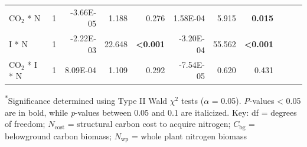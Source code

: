 \begin{landscape}
\begin{table}
{\begin{tabular}{p{3cm}p{0.5cm}p{1.75cm}p{1.5cm}p{1.5cm}p{1.75cm}p{1.5cm}p{1.5cm}p{1.75cm}p{1.5cm}p{1.5cm}}
            CO$_2$ * N & \multicolumn{1}{r}{1}
            & \multicolumn{1}{r}{-3.66E-05}     & \multicolumn{1}{r}{1.188}         & \multicolumn{1}{r}{0.276}
            & \multicolumn{1}{r}{1.58E-04}      & \multicolumn{1}{r}{5.915}         & \multicolumn{1}{r}{\textbf{0.015}}
            & \multicolumn{1}{r}{}              & \multicolumn{1}{r}{}              & \multicolumn{1}{r}{} 
            \\

            I * N & \multicolumn{1}{r}{1}
            & \multicolumn{1}{r}{-2.22E-03}     & \multicolumn{1}{r}{22.648}        & \multicolumn{1}{r}{\textbf{<0.001}}
            & \multicolumn{1}{r}{-3.20E-04}     & \multicolumn{1}{r}{55.562}        & \multicolumn{1}{r}{\textbf{<0.001}}
            & \multicolumn{1}{r}{}              & \multicolumn{1}{r}{}              & \multicolumn{1}{r}{} 
            \\

            CO$_2$ * I * N & \multicolumn{1}{r}{1}
            & \multicolumn{1}{r}{8.09E-04}      & \multicolumn{1}{r}{1.109}         & \multicolumn{1}{r}{0.292}
            & \multicolumn{1}{r}{-7.54E-05}     & \multicolumn{1}{r}{0.620}         & \multicolumn{1}{r}{0.431}
            & \multicolumn{1}{r}{}              & \multicolumn{1}{r}{}              & \multicolumn{1}{r}{} 
            \\
            \hline
    \end{tabular}}
    \label{tab:table5.4}
    \end{table}
\begin{singlespace}
    \noindent \textsuperscript{$*$}Significance determined using Type II Wald $\chi^{2}$ tests ($\alpha$ = 0.05). \textit{P}-values < 0.05 are in bold, while \textit{p}-values between 0.05 and 0.1 are italicized. Key: df = degrees of freedom; $N_\mathrm{cost}$ = structural carbon cost to acquire nitrogen; $C_\mathrm{bg}$ = belowground carbon biomass; $N_\mathrm{wp}$ = whole plant nitrogen biomass
\end{singlespace}
\end{landscape}
\clearpage


